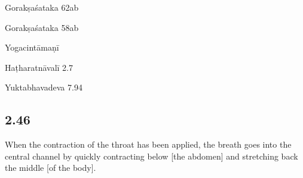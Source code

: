 \begin{ekdosis}
\begin{sources}[hp02_045]
Gorakṣaśataka 62ab

\begin{versinnote}
\end{versinnote}
Gorakṣaśataka 58ab

\begin{versinnote}
\end{versinnote}
\end{sources}

\begin{testimonia}[hp02_045]
Yogacintāmaṇī

\begin{versinnote}
\end{versinnote}

Haṭharatnāvalī 2.7

\begin{versinnote}
\end{versinnote}

Yuktabhavadeva 7.94

\begin{versinnote}
\end{versinnote}
\end{testimonia}

\begin{philcomm}[hp02_045]
\end{philcomm}

\subsection*{2.46}
\begin{translation}[hp02_046]
When the contraction of the throat has been applied, the breath goes into the central channel by quickly contracting below [the abdomen] and stretching back the middle [of the body].
\end{translation}


\end{ekdosis}

